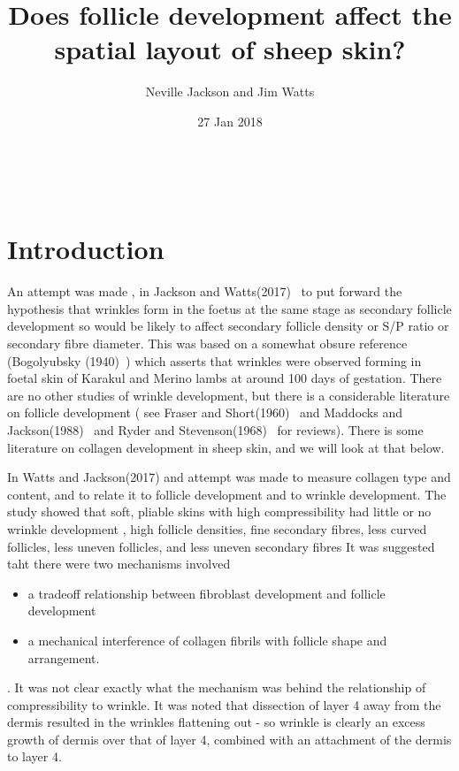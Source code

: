 \documentclass[titlepage]{article}  %
\title{Does follicle development affect the spatial layout of sheep skin?}
\author{Neville Jackson and Jim Watts}
\date{27 Jan 2018}
\begin{document}
 


 
\maketitle      
\tableofcontents

$\newcommand{\E}{\mathrm{E}}$
$\newcommand{\Var}{\mathrm{Var}}$
$\newcommand{\Cov}{\mathrm{Cov}}$ 
$\newcommand{\SD}{\mathrm{SD}}$ 

\clearpage
\section{Introduction} 
 An attempt was made , in Jackson and Watts(2017)~\cite{jack:17b} to put forward the hypothesis that wrinkles form in the foetus at the same stage as secondary follicle development so would be likely to affect secondary follicle density or S/P ratio or secondary fibre diameter. This was based on a somewhat obsure reference (Bogolyubsky (1940)~\cite{bogo:40}) which asserts that wrinkles were observed forming in foetal skin of Karakul and Merino lambs at around 100 days of gestation. There are no other studies of wrinkle development, but there is a considerable literature on follicle development ( see Fraser and Short(1960)~\cite{fras:60} and Maddocks and Jackson(1988)~\cite{madd:88} and Ryder and Stevenson(1968)~\cite{ryde:68} for reviews). There is some literature on collagen development in sheep skin, and we will look at that below.

In Watts and Jackson(2017) and attempt was made to measure collagen type and content, and to relate it to follicle development and to wrinkle development. The study showed that soft, pliable skins with high compressibility had little or no wrinkle development , high follicle densities, fine secondary fibres, less curved follicles, less uneven follicles, and less uneven secondary fibres It was suggested taht there were two mechanisms involved
\begin{itemize}
\item a tradeoff relationship between fibroblast development and follicle development
\item a mechanical interference of collagen fibrils with follicle shape and arrangement.
\end{itemize}.
It was not clear exactly what the mechanism was behind the relationship of compressibility to wrinkle. It was noted that dissection of layer 4 away from the dermis resulted in the wrinkles flattening out - so wrinkle is clearly an excess growth of dermis over that of layer 4, combined with an attachment of the dermis to layer 4.
\end{document}
